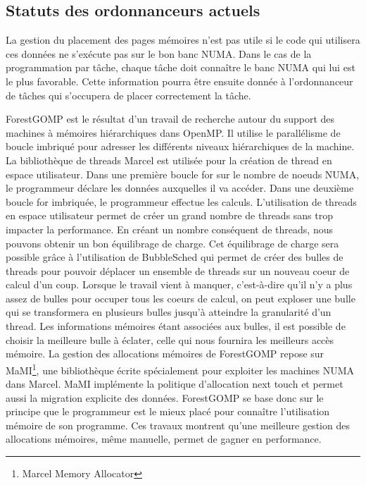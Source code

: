 \subsection{Statuts des ordonnanceurs actuels}
La gestion du placement des pages mémoires n'est pas utile si le code qui utilisera ces données ne s'exécute pas sur le bon banc NUMA.
%
Dans le cas de la programmation par tâche, chaque tâche doit connaître le banc NUMA qui lui est le plus favorable.
%
Cette information pourra être ensuite donnée à l'ordonnanceur de tâches qui s'occupera de placer correctement la tâche.


ForestGOMP\cite{Bro10Thesis} est le résultat d'un travail de recherche autour du support des machines à mémoires hiérarchiques dans OpenMP.
%
Il utilise le parallélisme de boucle imbriqué pour adresser les différents niveaux hiérarchiques de la machine.
%
La bibliothèque de threads Marcel\cite{marcel} est utilisée pour la création de thread en espace utilisateur.
%
Dans une première boucle for sur le nombre de noeuds NUMA, le programmeur déclare les données auxquelles il va accéder.
%
Dans une deuxième boucle for imbriquée, le programmeur effectue les calculs.
%
L'utilisation de threads en espace utilisateur permet de créer un grand nombre de threads sans trop impacter la performance.
%
En créant un nombre conséquent de threads, nous pouvons obtenir un bon équilibrage de charge.
%
Cet équilibrage de charge sera possible grâce à l'utilisation de BubbleSched\cite{bubblesched} qui permet de créer des bulles de threads pour pouvoir déplacer un ensemble de threads sur un nouveau coeur de calcul d'un coup.
%
Lorsque le travail vient à manquer, c'est-à-dire qu'il n'y a plus assez de bulles pour occuper tous les coeurs de calcul, on peut exploser une bulle qui se transformera en plusieurs bulles jusqu'à atteindre la granularité d'un thread.
%
Les informations mémoires étant associées aux bulles, il est possible de choisir la meilleure bulle à éclater, celle qui nous fournira les meilleurs accès mémoire.
%
La gestion des allocations mémoires de ForestGOMP repose sur MaMI\footnote{Marcel Memory Allocator}, une bibliothèque écrite spécialement pour exploiter les machines NUMA dans Marcel.
%
MaMI implémente la politique d'allocation next touch et permet aussi la migration explicite des données.
%
ForestGOMP se base donc sur le principe que le programmeur est le mieux placé pour connaître l'utilisation mémoire de son programme.
%
Ces travaux montrent qu'une meilleure gestion des allocations mémoires, même manuelle, permet de gagner en performance.


